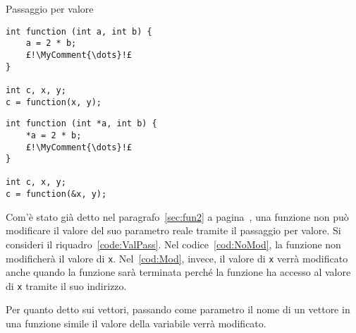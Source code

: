 \begin{code}
\centering
\caption{Passaggio per valore}
\label{code:ValPass}
	\begin{minipage}{0.45\columnwidth}
\begin{lstlisting}[caption={\em \lstinline!x! non viene modificato.},label={cod:NoMod},nolol]
int function (int a, int b) {
	a = 2 * b;
	£!\MyComment{\dots}!£
}

int c, x, y;
c = function(x, y);
\end{lstlisting}
	\end{minipage}	\hfill
	\begin{minipage}{0.5\columnwidth}
\begin{lstlisting}[caption={\em \lstinline!x! viene modificato.},label={cod:Mod},nolol]
int function (int *a, int b) {
	*a = 2 * b;
	£!\MyComment{\dots}!£
}

int c, x, y;
c = function(&x, y);
\end{lstlisting}
	\end{minipage}
\end{code}
Com'è stato già detto nel paragrafo~\ref{sec:fun2} a pagina~\pageref{sec:fun2}, una funzione non può modificare il valore del suo parametro reale tramite il passaggio per valore.
Si consideri il riquadro~\ref{code:ValPass}.
Nel codice~\ref{cod:NoMod}, la funzione non modificherà il valore di \lstinline!x!.
Nel~\ref{cod:Mod}, invece, il valore di \lstinline!x! verrà modificato anche quando la funzione sarà terminata perché la funzione ha accesso al valore di \lstinline!x! tramite il suo indirizzo.

Per quanto detto sui vettori, passando come parametro il nome di un vettore in una funzione simile il valore della variabile verrà modificato.